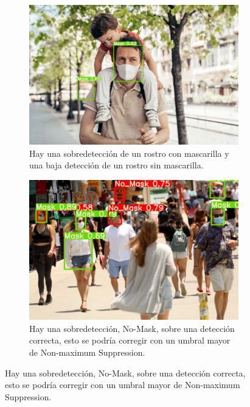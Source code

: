 \begin{figure}[htb]
    \centering %
\begin{subfigure}{0.45\textwidth}
  \includegraphics[width=\linewidth]{images/covid_test5.jpg}
  \caption{Hay una sobredetección de un rostro con mascarilla y una baja detección de un rostro sin mascarilla.}
  \label{fig:1}
\end{subfigure}\hfil %
\begin{subfigure}{0.45\textwidth}
  \includegraphics[width=\linewidth]{images/covid_test2.jpg}
  \caption{Hay una sobredetección, No-Mask, sobre una detección correcta, esto se podría corregir con un umbral mayor de Non-maximum Suppression.}
  \label{fig:2}
\end{subfigure}\hfil %


\end{figure}
